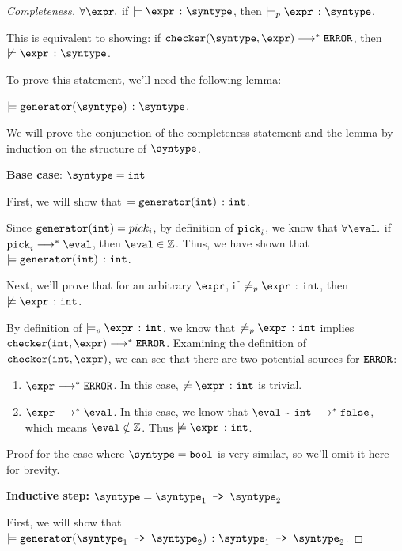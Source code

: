 \begin{proof}[Completeness]
  $\forall \expr.$ if $\models \hastype{\expr}{\syntype}$, then $\models_p \hastype{\expr}{\syntype}$.

  This is equivalent to showing: if $\mkche{\syntype}{\expr} \smallsteps[] \eerror$, then $\not\models \hastype{\expr}{\syntype}$.

  To prove this statement, we'll need the following lemma:

  \begin{lemma}
    $\models \hastype{\mkgen{\syntype}}{\syntype}$.
  \end{lemma}

  We will prove the conjunction of the completeness statement and the lemma by induction on the structure of $\syntype$.

  \textbf{Base case}: $\syntype = \tint$

  First, we will show that $\models \texttt{generator}(\texttt{int})\ \colon \texttt{int}$.
  
  Since $\texttt{generator}(\texttt{int}) = pick_i$, by definition of $\texttt{pick}_i$, we know that $\forall \eval.$ if $\pick_i \smallsteps[] \eval$, then $\eval \in \mathbb{Z}$. Thus, we have shown that $\models \texttt{generator}(\texttt{int})\ \colon \texttt{int}$.

  Next, we'll prove that for an arbitrary $\expr$, if $\not \models_p \hastype{\expr}{\tint}$, then $\not\models \hastype{\expr}{\tint}$.

  By definition of $\models_p \hastype{\expr}{\tint}$, we know that $\not\models_p \hastype{\expr}{\tint}$ implies $\mkche{\tint}{\expr} \smallsteps[] \eerror$. Examining the definition of $\mkche{\tint}{\expr}$, we can see that there are two potential sources for $\texttt{ERROR}$:
  \begin{enumerate}
    \item $\expr \smallsteps[] \eerror$. In this case, $\not\models \hastype{\expr}{\tint}$ is trivial. 
    \item $\expr \smallsteps[] \eval$. In this case, we know that $\matches{\eval}{\tint} \smallsteps[] \texttt{false}$, which means $\eval \notin \mathbb{Z}$. Thus $\not\models \hastype{\expr}{\tint}$. 
  \end{enumerate}

  Proof for the case where $\syntype = \tbool$ is very similar, so we'll omit it here for brevity.

  \textbf{Inductive step:} $\syntype = \mkfun{\syntype_1}{\syntype_2}$

  First, we will show that $\models \hastype{\mkgen{\mkfun{\syntype_1}{\syntype_2}}}{\mkfun{\syntype_1}{\syntype_2}}$.


\end{proof}
